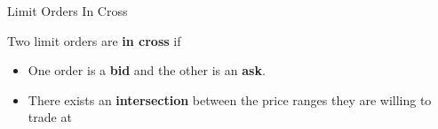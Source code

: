 \begin{frame}{Limit Orders In Cross}

  \begin{sqt:definition}
    Two limit orders are \textbf{in cross} if
    \begin{itemize}
      \item One order is a \textbf{bid} and the other is an \textbf{ask}.
      \item There exists an \textbf{intersection} between the price ranges they are willing to trade at
    \end{itemize}
  \end{sqt:definition}
  \begin{center}
    
  \end{center}
\end{frame}
